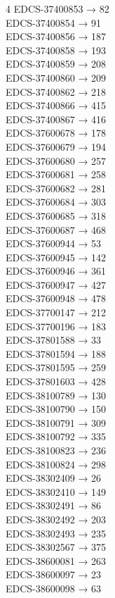 \begin{multicols}{4}
EDCS-37400853 → 82\\
EDCS-37400854 → 91\\
EDCS-37400856 → 187\\
EDCS-37400858 → 193\\
EDCS-37400859 → 208\\
EDCS-37400860 → 209\\
EDCS-37400862 → 218\\
EDCS-37400866 → 415\\
EDCS-37400867 → 416\\
EDCS-37600678 → 178\\
EDCS-37600679 → 194\\
EDCS-37600680 → 257\\
EDCS-37600681 → 258\\
EDCS-37600682 → 281\\
EDCS-37600684 → 303\\
EDCS-37600685 → 318\\
EDCS-37600687 → 468\\
EDCS-37600944 → 53\\
EDCS-37600945 → 142\\
EDCS-37600946 → 361\\
EDCS-37600947 → 427\\
EDCS-37600948 → 478\\
EDCS-37700147 → 212\\
EDCS-37700196 → 183\\
EDCS-37801588 → 33\\
EDCS-37801594 → 188\\
EDCS-37801595 → 259\\
EDCS-37801603 → 428\\
EDCS-38100789 → 130\\
EDCS-38100790 → 150\\
EDCS-38100791 → 309\\
EDCS-38100792 → 335\\
EDCS-38100823 → 236\\
EDCS-38100824 → 298\\
EDCS-38302409 → 26\\
EDCS-38302410 → 149\\
EDCS-38302491 → 86\\
EDCS-38302492 → 203\\
EDCS-38302493 → 235\\
EDCS-38302567 → 375\\
EDCS-38600081 → 263\\
EDCS-38600097 → 23\\
EDCS-38600098 → 63\\

\end{multicols}
